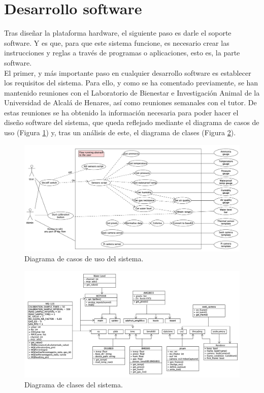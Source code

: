 \section{Desarrollo software}
\label{sec:dessw}
Tras diseñar la plataforma hardware, el siguiente paso es darle el soporte software. Y es que, para que este sistema funcione, es necesario crear las instrucciones y reglas a través de programas o aplicaciones, esto es, la parte software.\\

El primer, y más importante paso en cualquier desarrollo software es establecer los requisitos del sistema. Para ello, y como se ha comentado previamente, se han mantenido reuniones con el Laboratorio de Bienestar e Investigación Animal de la Universidad de Alcalá de Henares, así como reuniones semanales con el tutor. De estas reuniones se ha obtenido la información necesaria para poder hacer el diseño software del sistema, que queda reflejado mediante el diagrama de casos de uso (Figura \ref{fig:casos}) y, tras un análisis de este, el diagrama de clases (Figura \ref{fig:umlet}).\\
\begin{figure} [h!]
  \begin{center}
    \includegraphics[width=17cm]{figs/casos}
  \end{center}
  \caption{Diagrama de casos de uso del sistema.}
  \label{fig:casos}
\end{figure}

\begin{figure} [h!]
  \begin{center}
    \includegraphics[width=17cm]{figs/umlet}
  \end{center}
  \caption{Diagrama de clases del sistema.}
  \label{fig:umlet}
\end{figure}

